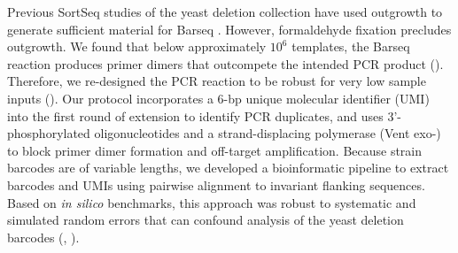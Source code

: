
Previous SortSeq studies of
the yeast deletion collection have used outgrowth 
to generate sufficient material for 
Barseq \parencite{sliva2016barcode}. However, formaldehyde fixation precludes
outgrowth. We found that below approximately $10^6$ templates, the
Barseq reaction produces primer dimers
that outcompete the intended PCR product (). 
Therefore, we re-designed the
PCR reaction \parencite{robinson2014design,smith2009quantitative} to be robust for
very low sample inputs (). Our protocol
incorporates a 6-bp unique molecular identifier (UMI) into the first
round of extension to identify PCR duplicates, 
and uses 3'-phosphorylated oligonucleotides and a
strand-displacing polymerase (Vent exo-) to block primer dimer formation and 
off-target amplification. 
Because strain barcodes are of variable lengths, 
we developed a bioinformatic pipeline to extract barcodes and UMIs 
using pairwise alignment to invariant flanking sequences.
Based on \textit{in silico} benchmarks, this
approach was robust to systematic and simulated random errors 
that can confound analysis of the yeast deletion barcodes 
(, ). 

